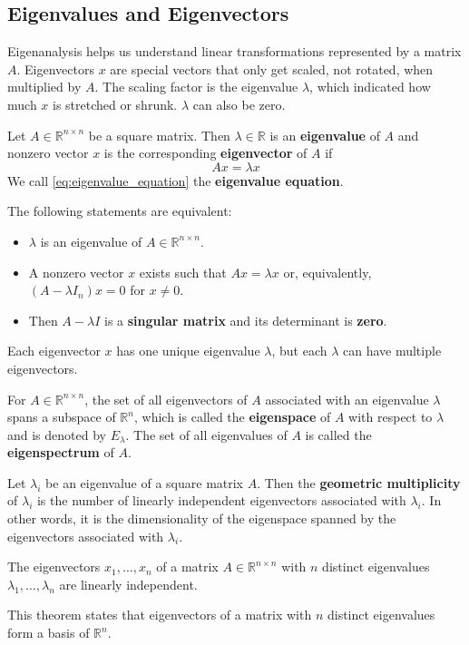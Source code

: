 \documentclass{article}
\begin{document}
\subsection{Eigenvalues and Eigenvectors}
Eigenanalysis helps us understand linear transformations represented by a
matrix $A$. Eigenvectors $x$ are special vectors that only get scaled, not
rotated, when multiplied by $A$. The scaling factor is the eigenvalue
$\lambda$, which indicated how much $x$ is stretched or shrunk. $\lambda$ can
also be zero.
\begin{definition}
    Let $A\in \mathbb{R}^{n\times n}$ be a square matrix. Then $\lambda\in
    \mathbb{R}$ is an \textbf{eigenvalue} of $A$ and nonzero vector $x$ is the
    corresponding \textbf{eigenvector} of $A$ if 
    \begin{equation}\label{eq:eigenvalue_equation}
        Ax=\lambda x
    \end{equation}
    We call \ref{eq:eigenvalue_equation} the \textbf{eigenvalue equation}.
\end{definition}
The following statements are equivalent:
\begin{itemize}
    \item $\lambda$ is an eigenvalue of $A\in \mathbb{R}^{n\times n}$.
    \item A nonzero vector $x$ exists such that $Ax=\lambda x$ or,
        equivalently, $(A-\lambda I_n)x=0$ for $x\neq 0$.
    \item Then $A-\lambda I$ is a \textbf{singular
        matrix} and its determinant is \textbf{zero}.
\end{itemize}
Each eigenvector $x$ has one unique eigenvalue $\lambda$, but each $\lambda$
can have multiple eigenvectors.
\begin{definition}
    For $A\in \mathbb{R}^{n\times n}$, the set of all eigenvectors of $A$
    associated with an eigenvalue $\lambda$ spans a subspace of
    $\mathbb{R}^n$, which is called the \textbf{eigenspace} of $A$ with
    respect to $\lambda$ and is denoted by $E_{\lambda}$. The set of all
    eigenvalues of $A$ is called the \textbf{eigenspectrum} of $A$.
\end{definition}
\begin{definition}
    Let $\lambda_i$ be an eigenvalue of a square matrix $A$. Then the
    \textbf{geometric multiplicity} of $\lambda_i$ is the number of linearly
    independent eigenvectors associated with $\lambda_{i}$. In other words, it
    is the dimensionality of the eigenspace spanned by the eigenvectors
    associated with $\lambda_i$.
\end{definition}
\begin{theorem}
    The eigenvectors $x_1,\ldots,x_n$ of a matrix $A\in \mathbb{R}^{n\times
    n}$ with $n$ distinct eigenvalues $\lambda_1,\ldots,\lambda_n$ are
    linearly independent.
\end{theorem}
This theorem states that eigenvectors of a matrix with $n$ distinct eigenvalues
form a basis of $\mathbb{R}^n$.
\cleardoublepage
\end{document}
